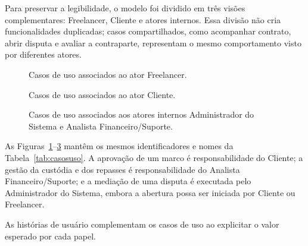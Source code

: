 Para preservar a legibilidade, o modelo foi dividido em três visões complementares: Freelancer, Cliente e atores internos. Essa divisão não cria funcionalidades duplicadas; casos compartilhados, como acompanhar contrato, abrir disputa e avaliar a contraparte, representam o mesmo comportamento visto por diferentes atores.

\begin{figure}[!htbp]
\centering
{}
\caption{Casos de uso associados ao ator Freelancer.}
\label{fig:uc-freelancer}
\end{figure}

\begin{figure}[!htbp]
\centering
{}
\caption{Casos de uso associados ao ator Cliente.}
\label{fig:uc-cliente}
\end{figure}

\begin{figure}[!htbp]
\centering
{}
\caption{Casos de uso associados aos atores internos Administrador do Sistema e Analista Financeiro/Suporte.}
\label{fig:uc-internos}
\end{figure}

As Figuras~\ref{fig:uc-freelancer}--\ref{fig:uc-internos} mantêm os mesmos identificadores e nomes da Tabela~\ref{tab:casosuso}. A aprovação de um marco é responsabilidade do Cliente; a gestão da custódia e dos repasses é responsabilidade do Analista Financeiro/Suporte; e a mediação de uma disputa é executada pelo Administrador do Sistema, embora a abertura possa ser iniciada por Cliente ou Freelancer.

As histórias de usuário complementam os casos de uso ao explicitar o valor esperado por cada papel.

